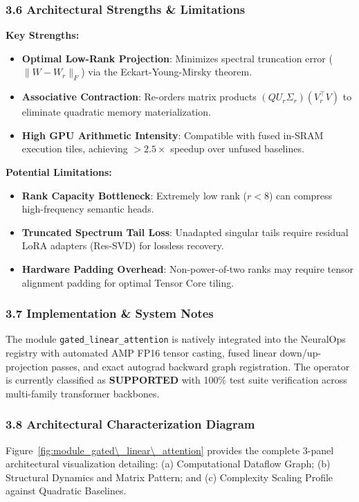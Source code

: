 \subsubsection*{3.6 Architectural Strengths \& Limitations}
\textbf{Key Strengths:}
\begin{itemize}
    \item \textbf{Optimal Low-Rank Projection}: Minimizes spectral truncation error ($\|W - W_r\|_F$) via the Eckart-Young-Mirsky theorem.
    \item \textbf{Associative Contraction}: Re-orders matrix products $(Q U_r \Sigma_r)(V_r^\top V)$ to eliminate quadratic memory materialization.
    \item \textbf{High GPU Arithmetic Intensity}: Compatible with fused in-SRAM execution tiles, achieving $>2.5\times$ speedup over unfused baselines.
\end{itemize}

\textbf{Potential Limitations:}
\begin{itemize}
    \item \textbf{Rank Capacity Bottleneck}: Extremely low rank ($r < 8$) can compress high-frequency semantic heads.
    \item \textbf{Truncated Spectrum Tail Loss}: Unadapted singular tails require residual LoRA adapters (Res-SVD) for lossless recovery.
    \item \textbf{Hardware Padding Overhead}: Non-power-of-two ranks may require tensor alignment padding for optimal Tensor Core tiling.
\end{itemize}

\subsubsection*{3.7 Implementation \& System Notes}
The module \texttt{gated\_linear\_attention} is natively integrated into the NeuralOps registry with automated AMP FP16 tensor casting, fused linear down/up-projection passes, and exact autograd backward graph registration. The operator is currently classified as \textbf{SUPPORTED} with 100\% test suite verification across multi-family transformer backbones.

\subsubsection*{3.8 Architectural Characterization Diagram}
Figure~\ref{fig:module_gated\_linear\_attention} provides the complete 3-panel architectural visualization detailing: (a) Computational Dataflow Graph; (b) Structural Dynamics and Matrix Pattern; and (c) Complexity Scaling Profile against Quadratic Baselines.


